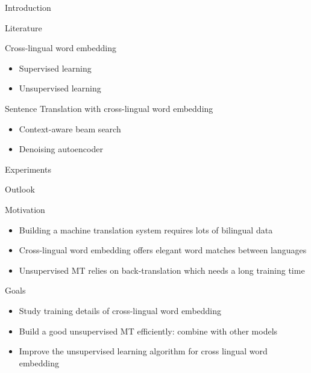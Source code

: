 \documentclass[11pt, a4paper, landscape]{article}
\begin{document}
	\TitlePage
	
	\NewPage
	
	
	\vfill
	\begin{description}
		\item Introduction
		\item Literature
		\item Cross-lingual word embedding
		\begin{itemize}
			\item Supervised learning
			\item Unsupervised learning
		\end{itemize}
		\item Sentence Translation with cross-lingual word embedding
		\begin{itemize}
			\item Context-aware beam search
			\item Denoising autoencoder
		\end{itemize}
		\item Experiments

		\item Outlook
	\end{description}
	\vfill
	
	\NewPage
	
	\vfill
	\begin{description}
		\item Motivation
		\begin{itemize}
			\item Building a machine translation system requires lots of bilingual data
			\item Cross-lingual word embedding offers elegant word matches between languages
			\item Unsupervised MT relies on back-translation which needs a long training time
		\end{itemize}
		\item Goals
		\begin{itemize}
			\item Study training details of cross-lingual word embedding
			\item Build a good unsupervised MT efficiently: combine with other models
			\item Improve the unsupervised learning algorithm for cross lingual word embedding
		\end{itemize}
		
	\end{description}
	\vfill
	
\end{document}
